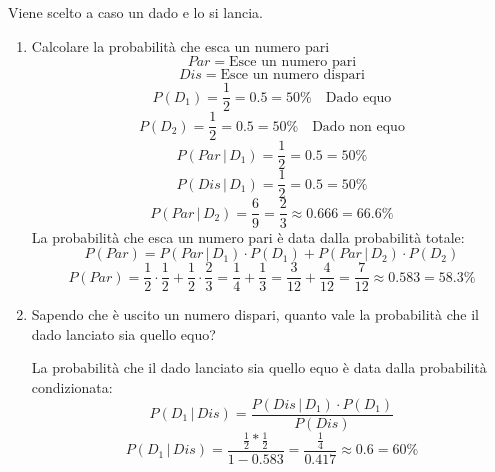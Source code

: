 \documentclass[a4paper]{article}
\theoremstyle{break}
\theoremstyle{break}
\theoremstyle{break}
\theoremstyle{break}
\begin{document}
\noindent Viene scelto a caso un dado e lo si lancia.
\begin{enumerate}
	\item Calcolare la probabilità che esca un numero pari
	      \[
		      Par = \text{Esce un numero pari}
	      \]
	      \[
		      Dis = \text{Esce un numero dispari}
	      \]
	      \[
		      P(D_1) = \frac{1}{2} = 0.5 = 50\% \quad \text{Dado equo}
	      \]
	      \[
		      P(D_2) = \frac{1}{2} = 0.5 = 50\% \quad \text{Dado non equo}
	      \]
	      \[
		      P(Par\,|\,D_1) = \frac{1}{2} = 0.5 = 50\%
	      \]
	      \[
		      P(Dis\,|\,D_1) = \frac{1}{2} = 0.5 = 50\%
	      \]
	      \[
		      P(Par\,|\,D_2) = \frac{6}{9} = \frac{2}{3} \approx 0.666 = 66.6\%
	      \]
	      La probabilità che esca un numero pari è data dalla probabilità totale:
	      \[
		      P(Par) = P(Par\,|\,D_1) \cdot P(D_1) + P(Par\,|\,D_2) \cdot P(D_2)
	      \]
	      \[
		      P(Par) = \frac{1}{2} \cdot \frac{1}{2} + \frac{1}{2} \cdot \frac{2}{3} = \frac{1}{4} + \frac{1}{3} = \frac{3}{12} + \frac{4}{12} = \frac{7}{12} \approx 0.583 = 58.3\%
	      \]
	\item Sapendo che è uscito un numero dispari, quanto vale la probabilità che il dado
	      lanciato sia quello equo?

	      \vspace{1em}
	      \noindent La probabilità che il dado lanciato sia quello equo è data dalla probabilità
	      condizionata:
	      \[
		      P(D_1\,|\,Dis) = \frac{P(Dis\,|\,D_1)\cdot P(D_1)}{P(Dis)}
	      \]
	      \[
		      P(D_1\,|\,Dis) = \frac{\frac{1}{2}*\frac{1}{2}}{1 - 0.583} = \frac{\frac{1}{4}}{0.417} \approx 0.6 = 60\%
	      \]
\end{enumerate}
\end{document}
